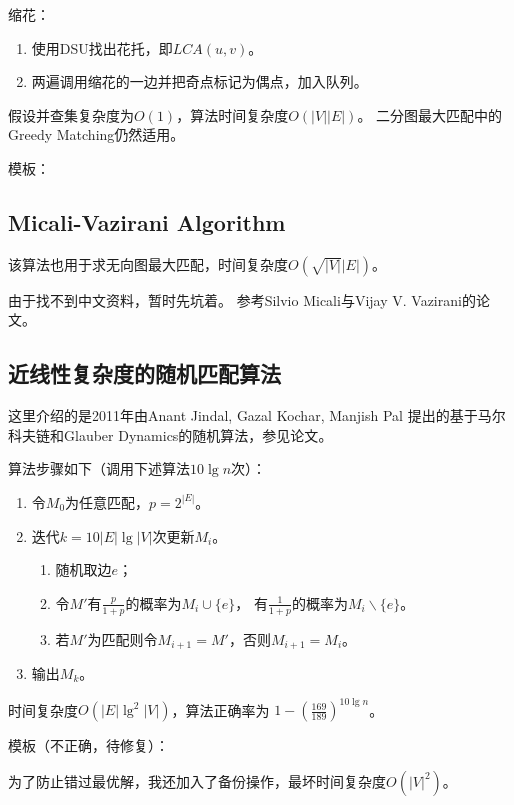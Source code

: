 缩花：
\begin{enumerate}
    \item 使用DSU找出花托，即$LCA(u,v)$。
    \item 两遍调用缩花的一边并把奇点标记为偶点，加入队列。
\end{enumerate}

假设并查集复杂度为$O(1)$，算法时间复杂度$O(|V||E|)$。
二分图最大匹配中的Greedy Matching仍然适用。

模板：


\subsection{Micali-Vazirani Algorithm}
该算法也用于求无向图最大匹配，时间复杂度$O(\sqrt{|V|}|E|)$。

由于找不到中文资料，暂时先坑着。
参考Silvio Micali与Vijay V. Vazirani的论文\cite{MMG}。
\subsection{近线性复杂度的随机匹配算法}
这里介绍的是2011年由Anant Jindal, Gazal Kochar, Manjish Pal
提出的基于马尔科夫链和Glauber Dynamics的随机算法，参见论文\cite{AGM}。

算法步骤如下（调用下述算法$10\lg n$次）：
\begin{enumerate}
    \item 令$M_0$为任意匹配，$p=2^{|E|}$。
    \item 迭代$k=10|E|\lg|V|$次更新$M_i$。
    \begin{enumerate}
        \item 随机取边$e$；
        \item 令$M'$有$\frac{p}{1+p}$的概率为$M_i\cup \{e\}$，
        有$\frac{1}{1+p}$的概率为$M_i \backslash \{e\}$。
        \item 若$M'$为匹配则令$M_{i+1}=M'$，否则$M_{i+1}=M_i$。
    \end{enumerate}
    \item 输出$M_k$。
\end{enumerate}

时间复杂度$O(|E|\lg^2|V|)$，算法正确率为
$1-\left(\frac{169}{189}\right)^{10\lg n}$。

模板（不正确，待修复）：

为了防止错过最优解，我还加入了备份操作，最坏时间复杂度$O(|V|^2)$。



